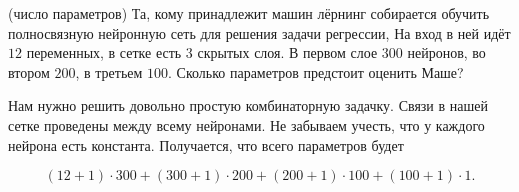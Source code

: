 
\begin{problem}{(число параметров)}
Та, кому принадлежит машин лёрнинг собирается обучить полносвязную нейронную сеть для решения задачи регрессии, На вход в ней идёт $12$ переменных, в сетке есть $3$ скрытых слоя. В первом слое $300$ нейронов, во втором $200$, в третьем $100$.  Сколько параметров предстоит оценить Маше?
\end{problem}

\begin{sol} 
Нам нужно решить довольно простую комбинаторную задачку. Связи в нашей сетке проведены между всему нейронами. Не забываем учесть, что у каждого нейрона есть константа. Получается, что всего параметров будет

\[
(12 + 1) \cdot 300 + (300 + 1) \cdot 200 + (200 + 1) \cdot 100 + (100 + 1) \cdot 1.
\]

\end{sol} 
